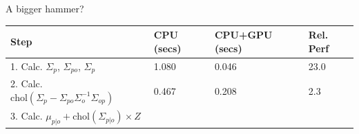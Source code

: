 \documentclass[11pt,ignorenonframetext,]{beamer}
\begin{document}
\begin{frame}{A bigger hammer?}
\protect\hypertarget{a-bigger-hammer}{}

\scriptsize

\begin{longtable}[]{@{}llll@{}}
\toprule
\begin{minipage}[b]{0.41\columnwidth}\raggedright
Step\strut
\end{minipage} & \begin{minipage}[b]{0.15\columnwidth}\raggedright
CPU (secs)\strut
\end{minipage} & \begin{minipage}[b]{0.19\columnwidth}\raggedright
CPU+GPU (secs)\strut
\end{minipage} & \begin{minipage}[b]{0.13\columnwidth}\raggedright
Rel. Perf\strut
\end{minipage}\tabularnewline
\midrule
\endhead
\begin{minipage}[t]{0.41\columnwidth}\raggedright
1. Calc. \(\Sigma_p\), \(\Sigma_{po}\), \(\Sigma_{p}\)\strut
\end{minipage} & \begin{minipage}[t]{0.15\columnwidth}\raggedright
1.080\strut
\end{minipage} & \begin{minipage}[t]{0.19\columnwidth}\raggedright
0.046\strut
\end{minipage} & \begin{minipage}[t]{0.13\columnwidth}\raggedright
23.0\strut
\end{minipage}\tabularnewline
\begin{minipage}[t]{0.41\columnwidth}\raggedright
2. Calc.
\(\text{chol}(\Sigma_p - \Sigma_{po} \Sigma_{o}^{-1} \Sigma_{op})\)\strut
\end{minipage} & \begin{minipage}[t]{0.15\columnwidth}\raggedright
0.467\strut
\end{minipage} & \begin{minipage}[t]{0.19\columnwidth}\raggedright
0.208\strut
\end{minipage} & \begin{minipage}[t]{0.13\columnwidth}\raggedright
2.3\strut
\end{minipage}\tabularnewline
\begin{minipage}[t]{0.41\columnwidth}\raggedright
3. Calc. \(\mu_{p|o} + \text{chol}(\Sigma_{p|o}) \times Z\)\strut
\end{minipage} & \begin{minipage}[t]{0.15\columnwidth}\raggedright

\end{minipage}
\end{longtable}
\end{frame}
\end{document}

